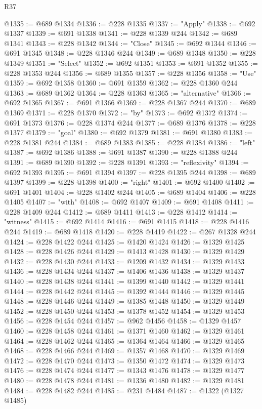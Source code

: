 \begin{lexlean}{R37}
\begin{coremodule}
@1335 := @689 @1334
@1336 := @228 @1335
@1337 := "Apply"
@1338 := @692 @1337
@1339 := @691 @1338
@1341 := @228 @1339 @244
@1342 := @689 @1341
@1343 := @228 @1342
@1344 := "Close"
@1345 := @692 @1344
@1346 := @691 @1345
@1348 := @228 @1346 @244
@1349 := @689 @1348
@1350 := @228 @1349
@1351 := "Select"
@1352 := @692 @1351
@1353 := @691 @1352
@1355 := @228 @1353 @244
@1356 := @689 @1355
@1357 := @228 @1356
@1358 := "Use"
@1359 := @692 @1358
@1360 := @691 @1359
@1362 := @228 @1360 @244
@1363 := @689 @1362
@1364 := @228 @1363
@1365 := "alternative"
@1366 := @692 @1365
@1367 := @691 @1366
@1369 := @228 @1367 @244
@1370 := @689 @1369
@1371 := @228 @1370
@1372 := "by"
@1373 := @692 @1372
@1374 := @691 @1373
@1376 := @228 @1374 @244
@1377 := @689 @1376
@1378 := @228 @1377
@1379 := "goal"
@1380 := @692 @1379
@1381 := @691 @1380
@1383 := @228 @1381 @244
@1384 := @689 @1383
@1385 := @228 @1384
@1386 := "left"
@1387 := @692 @1386
@1388 := @691 @1387
@1390 := @228 @1388 @244
@1391 := @689 @1390
@1392 := @228 @1391
@1393 := "reflexivity"
@1394 := @692 @1393
@1395 := @691 @1394
@1397 := @228 @1395 @244
@1398 := @689 @1397
@1399 := @228 @1398
@1400 := "right"
@1401 := @692 @1400
@1402 := @691 @1401
@1404 := @228 @1402 @244
@1405 := @689 @1404
@1406 := @228 @1405
@1407 := "with"
@1408 := @692 @1407
@1409 := @691 @1408
@1411 := @228 @1409 @244
@1412 := @689 @1411
@1413 := @228 @1412
@1414 := "witness"
@1415 := @692 @1414
@1416 := @691 @1415
@1418 := @228 @1416 @244
@1419 := @689 @1418
@1420 := @228 @1419
@1422 := @267 @1328 @244
@1424 := @228 @1422 @244
@1425 := @1420 @1424
@1426 := @1329 @1425
@1428 := @228 @1426 @244
@1429 := @1413 @1428
@1430 := @1329 @1429
@1432 := @228 @1430 @244
@1433 := @1209 @1432
@1434 := @1329 @1433
@1436 := @228 @1434 @244
@1437 := @1406 @1436
@1438 := @1329 @1437
@1440 := @228 @1438 @244
@1441 := @1399 @1440
@1442 := @1329 @1441
@1444 := @228 @1442 @244
@1445 := @1392 @1444
@1446 := @1329 @1445
@1448 := @228 @1446 @244
@1449 := @1385 @1448
@1450 := @1329 @1449
@1452 := @228 @1450 @244
@1453 := @1378 @1452
@1454 := @1329 @1453
@1456 := @228 @1454 @244
@1457 := @962 @1456
@1458 := @1329 @1457
@1460 := @228 @1458 @244
@1461 := @1371 @1460
@1462 := @1329 @1461
@1464 := @228 @1462 @244
@1465 := @1364 @1464
@1466 := @1329 @1465
@1468 := @228 @1466 @244
@1469 := @1357 @1468
@1470 := @1329 @1469
@1472 := @228 @1470 @244
@1473 := @1350 @1472
@1474 := @1329 @1473
@1476 := @228 @1474 @244
@1477 := @1343 @1476
@1478 := @1329 @1477
@1480 := @228 @1478 @244
@1481 := @1336 @1480
@1482 := @1329 @1481
@1484 := @228 @1482 @244
@1485 := @231 @1484
@1487 := @1322 (@1327 @1485)

\end{coremodule}
\end{lexlean}
